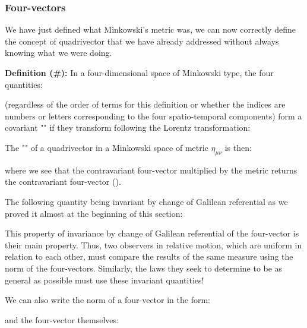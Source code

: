 	\subsubsection{Four-vectors}
	We have just defined what Minkowski's metric was, we can now correctly define the concept of quadrivector that we have already addressed without always knowing what we were doing.
	
	\textbf{Definition (\#\mydef):} In a four-dimensional space of Minkowski type, the four quantities:
	
	(regardless of the order of terms for this definition or whether the indices are numbers or letters corresponding to the four spatio-temporal components) form a covariant "" if they transform following the Lorentz transformation:	
	
	The "" of a quadrivector in a Minkowski space of metric $\eta_{\mu\nu}$ is then:
	
	where we see that the contravariant four-vector multiplied by the metric returns the contravariant four-vector ().

	The following quantity being invariant by change of Galilean referential as we proved it almost at the beginning of this section:
	
	This property of invariance by change of Galilean referential of the four-vector is their main property. Thus, two observers in relative motion, which are uniform in relation to each other, must compare the results of the same measure using the norm of the four-vectors. Similarly, the laws they seek to determine to be as general as possible must use these invariant quantities! 
	
	We can also write the norm of a four-vector in the form:
	
	and the four-vector themselves:
	
